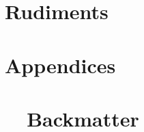 \documentclass[10pt]{newsiambook}
\begin{document}
\frontmatter
%
\tableofcontents
%
\listoffigures
\listoftables
%
%
%

\mainmatter
\part{Rudiments}


%
\part{Appendices}
\appendix
%
%
%
%
%
%
%
%

\part{\ \ Backmatter}
\backmatter
%
%
%
%



\printindex
\end{document}
